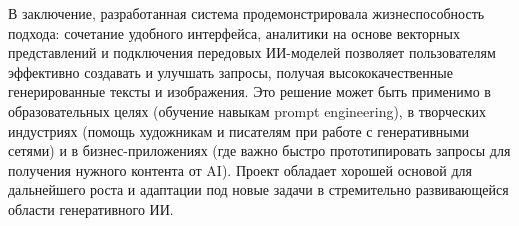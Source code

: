 В заключение, разработанная система продемонстрировала жизнеспособность подхода: сочетание удобного интерфейса, аналитики на основе векторных представлений и подключения передовых ИИ-моделей позволяет пользователям эффективно создавать и улучшать запросы, получая высококачественные генерированные тексты и изображения. Это решение может быть применимо в образовательных целях (обучение навыкам prompt engineering), в творческих индустриях (помощь художникам и писателям при работе с генеративными сетями) и в бизнес-приложениях (где важно быстро прототипировать запросы для получения нужного контента от AI). Проект обладает хорошей основой для дальнейшего роста и адаптации под новые задачи в стремительно развивающейся области генеративного ИИ.
